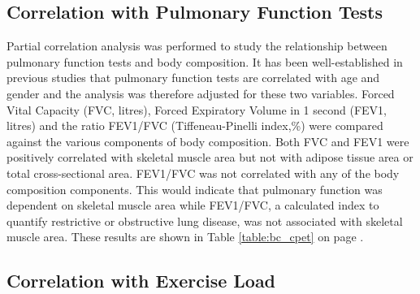 \subsection{Correlation with Pulmonary Function Tests}

Partial correlation analysis was performed to study the relationship between pulmonary function tests and body composition. 
It has been well-established in previous studies that pulmonary function tests are correlated with age and gender and the analysis was therefore adjusted for these two variables. 
Forced Vital Capacity (FVC, litres), Forced Expiratory Volume in 1 second (FEV1, litres) and the ratio FEV1/FVC (Tiffeneau-Pinelli index,\%) were compared against the various components of body composition. 
Both FVC and FEV1 were positively correlated with skeletal muscle area but not with adipose tissue area or total cross-sectional area. 
FEV1/FVC was not correlated with any of the body composition components. 
This would indicate that pulmonary function was dependent on skeletal muscle area while FEV1/FVC, a calculated index to quantify restrictive or obstructive lung disease, was not associated with skeletal muscle area. 
These results are shown in Table \ref{table:bc_cpet} on page \pageref{table:bc_cpet}.

\subsection{Correlation with Exercise Load}

